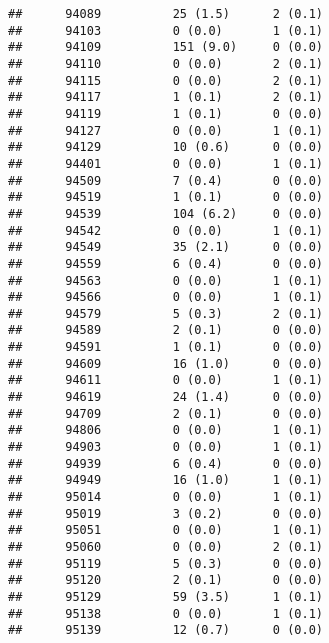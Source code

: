 \documentclass[]{article}
\begin{document}
\begin{verbatim}
##      94089          25 (1.5)      2 (0.1)                        
##      94103          0 (0.0)       1 (0.1)                        
##      94109          151 (9.0)     0 (0.0)                        
##      94110          0 (0.0)       2 (0.1)                        
##      94115          0 (0.0)       2 (0.1)                        
##      94117          1 (0.1)       2 (0.1)                        
##      94119          1 (0.1)       0 (0.0)                        
##      94127          0 (0.0)       1 (0.1)                        
##      94129          10 (0.6)      0 (0.0)                        
##      94401          0 (0.0)       1 (0.1)                        
##      94509          7 (0.4)       0 (0.0)                        
##      94519          1 (0.1)       0 (0.0)                        
##      94539          104 (6.2)     0 (0.0)                        
##      94542          0 (0.0)       1 (0.1)                        
##      94549          35 (2.1)      0 (0.0)                        
##      94559          6 (0.4)       0 (0.0)                        
##      94563          0 (0.0)       1 (0.1)                        
##      94566          0 (0.0)       1 (0.1)                        
##      94579          5 (0.3)       2 (0.1)                        
##      94589          2 (0.1)       0 (0.0)                        
##      94591          1 (0.1)       0 (0.0)                        
##      94609          16 (1.0)      0 (0.0)                        
##      94611          0 (0.0)       1 (0.1)                        
##      94619          24 (1.4)      0 (0.0)                        
##      94709          2 (0.1)       0 (0.0)                        
##      94806          0 (0.0)       1 (0.1)                        
##      94903          0 (0.0)       1 (0.1)                        
##      94939          6 (0.4)       0 (0.0)                        
##      94949          16 (1.0)      1 (0.1)                        
##      95014          0 (0.0)       1 (0.1)                        
##      95019          3 (0.2)       0 (0.0)                        
##      95051          0 (0.0)       1 (0.1)                        
##      95060          0 (0.0)       2 (0.1)                        
##      95119          5 (0.3)       0 (0.0)                        
##      95120          2 (0.1)       0 (0.0)                        
##      95129          59 (3.5)      1 (0.1)                        
##      95138          0 (0.0)       1 (0.1)                        
##      95139          12 (0.7)      0 (0.0)                        

\end{verbatim}
\end{document}
